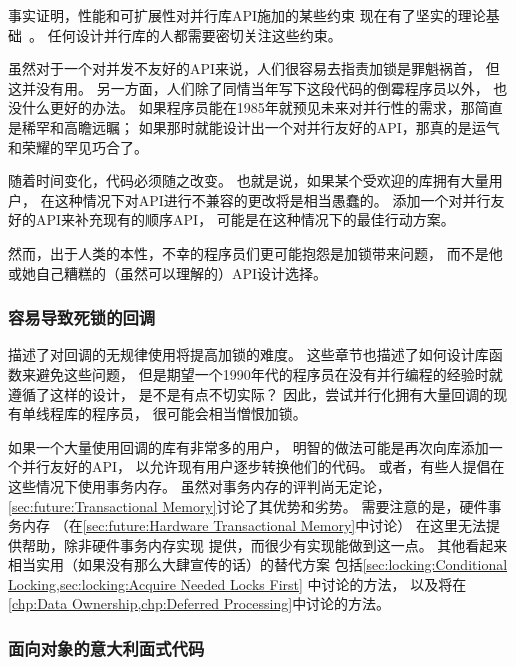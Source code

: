 事实证明，性能和可扩展性对并行库API施加的某些约束
现在有了坚实的理论基础~\cite{HagitAttiya2011LawsOfOrder,Attiya:2011:LOE:1925844.1926442,PaulEMcKenney2011SNC}。
任何设计并行库的人都需要密切关注这些约束。

虽然对于一个对并发不友好的API来说，人们很容易去指责加锁是罪魁祸首，
但这并没有用。
另一方面，人们除了同情当年写下这段代码的倒霉程序员以外，
也没什么更好的办法。
如果程序员能在1985年就预见未来对并行性的需求，那简直是稀罕和高瞻远瞩；
如果那时就能设计出一个对并行友好的API，那真的是运气和荣耀的罕见巧合了。

随着时间变化，代码必须随之改变。
也就是说，如果某个受欢迎的库拥有大量用户，
在这种情况下对API进行不兼容的更改将是相当愚蠢的。
添加一个对并行友好的API来补充现有的顺序API，
可能是在这种情况下的最佳行动方案。

然而，出于人类的本性，不幸的程序员们更可能抱怨是加锁带来问题，
而不是他或她自己糟糕的（虽然可以理解的）API设计选择。

\subsubsection{容易导致死锁的回调}
\label{sec:locking:Deadlock-Prone Callbacks}

描述了对回调的无规律使用将提高加锁的难度。
这些章节也描述了如何设计库函数来避免这些问题，
但是期望一个1990年代的程序员在没有并行编程的经验时就遵循了这样的设计，
是不是有点不切实际？
因此，尝试并行化拥有大量回调的现有单线程库的程序员，
很可能会相当憎恨加锁。

如果一个大量使用回调的库有非常多的用户，
明智的做法可能是再次向库添加一个并行友好的API，
以允许现有用户逐步转换他们的代码。
或者，有些人提倡在这些情况下使用事务内存。
虽然对事务内存的评判尚无定论，
\cref{sec:future:Transactional Memory}讨论了其优势和劣势。
需要注意的是，硬件事务内存
（在\cref{sec:future:Hardware Transactional Memory}中讨论）
在这里无法提供帮助，除非硬件事务内存实现
提供，而很少有实现能做到这一点。
其他看起来相当实用（如果没有那么大肆宣传的话）的替代方案
包括\cref{sec:locking:Conditional Locking,sec:locking:Acquire Needed Locks First}
中讨论的方法，
以及将在\cref{chp:Data Ownership,chp:Deferred Processing}中讨论的方法。

\subsubsection{面向对象的意大利面式代码}
\label{sec:locking:Object-Oriented Spaghetti Code}

